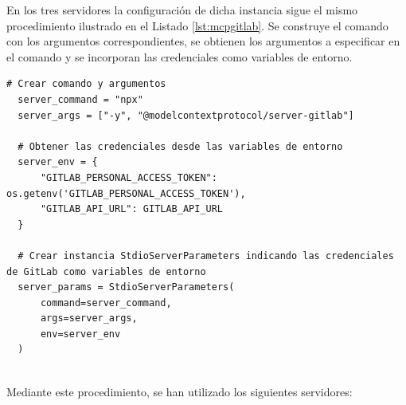 En los tres servidores la configuración de dicha instancia sigue el mismo procedimiento ilustrado en el Listado \ref{lst:mcpgitlab}. Se construye el comando con los argumentos correspondientes, se obtienen los argumentos a especificar en el comando y se incorporan las credenciales como variables de entorno.

\begin{lstlisting}[caption={mcp\_multi\_client.py: instanciado de StdioServerParameters para el servidor MCP de GitLab},label={lst:mcpgitlab}]
  # Crear comando y argumentos
  server_command = "npx"
  server_args = ["-y", "@modelcontextprotocol/server-gitlab"]

  # Obtener las credenciales desde las variables de entorno
  server_env = {
      "GITLAB_PERSONAL_ACCESS_TOKEN": os.getenv('GITLAB_PERSONAL_ACCESS_TOKEN'),
      "GITLAB_API_URL": GITLAB_API_URL
  }

  # Crear instancia StdioServerParameters indicando las credenciales de GitLab como variables de entorno
  server_params = StdioServerParameters(
      command=server_command,
      args=server_args,
      env=server_env
  )
  
\end{lstlisting}
Mediante este procedimiento, se han utilizado los siguientes servidores:
